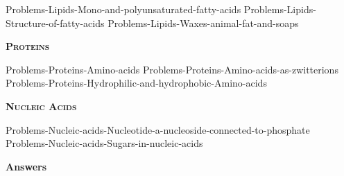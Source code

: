 \documentclass[main.tex]{subfiles}
\begin{document}
\begin{multicols*}{2}
 {Problems-Lipids-Mono-and-polyunsaturated-fatty-acids}
 {Problems-Lipids-Structure-of-fatty-acids}
 {Problems-Lipids-Waxes-animal-fat-and-soaps}


 





{\raggedright\textsc{\textbf{Proteins}}\par}




  {Problems-Proteins-Amino-acids}
 {Problems-Proteins-Amino-acids-as-zwitterions}
 {Problems-Proteins-Hydrophilic-and-hydrophobic-Amino-acids}





 

 

{\raggedright\textsc{\textbf{Nucleic Acids}}\par}


 {Problems-Nucleic-acids-Nucleotide-a-nucleoside-connected-to-phosphate}
 {Problems-Nucleic-acids-Sugars-in-nucleic-acids}
 
 

\end{multicols*}
\newpage
\begin{answersenvironment}
\begin{minipage}[c]{1\textwidth}
\begin{localsize}{10}
{\Large \bf Answers}
 \printsolutions 
\end{localsize}
\end{minipage}\end{answersenvironment}
\end{document}
